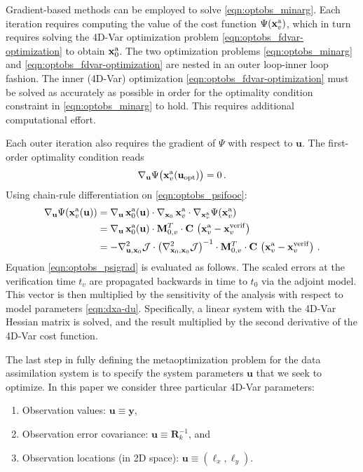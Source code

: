 \documentclass{article}
\newcommand{\Jfunc}{\mathcal J }
\newcommand{\M}{\mathbf{M}}
\newcommand{\C}{\mathbf{C}}
\newcommand{\R}{\mathbf{R}}
\newcommand{\x}{   \mathbf{x} }
\newcommand{\xa}{ \mathbf{x}^{\rm a} }
\newcommand{\y}{ \mathbf{y} }
\renewcommand{\u}{ \mathbf{u} }
\begin{document}
Gradient-based methods can be employed to solve \eqref{eqn:optobs_minarg}.
Each iteration requires computing the value of the cost function $\Psi(\xa_v)$,
which in turn requires solving the 4D-Var optimization problem \eqref{eqn:optobs_fdvar-optimization}   to obtain $\xa_0$.
The two optimization problems \eqref{eqn:optobs_minarg} and \eqref{eqn:optobs_fdvar-optimization} are nested in an outer loop-inner loop fashion.
The inner (4D-Var) optimization \eqref{eqn:optobs_fdvar-optimization} must be solved as accurately as possible 
in order for the optimality condition constraint in \eqref{eqn:optobs_minarg} to hold.
This requires additional computational effort.

Each outer iteration also requires the gradient of $\Psi$ with respect to $\u$.
The first-order optimality condition reads
\begin{align}
 \nabla_\u \Psi\bigl(\xa_v(\u_\textrm{opt})\bigr) = 0\,.
 \label{eqn:optobs_psifooc}
 \end{align}
Using chain-rule differentiation on \eqref{eqn:optobs_psifooc}:
\begin{align}
 \nabla_\u \Psi(\xa_v(\u)) &= \nabla_\u \, \xa_0(\u) \cdot \nabla_{\x_0} \, \xa_v \cdot \nabla_{\xa_v} \Psi(\xa_v) \nonumber \\
                                 &= \nabla_\u \, \xa_0(\u) \cdot \M^T_{0,v} \cdot \C \, \left( \xa_v -\x^{\rm verif}_v \right) \nonumber \\
                              &=    -\nabla_{\u,\x_0}^2 \Jfunc  \cdot \left(\nabla_{\x_0,\x_0}^2 \Jfunc \right) ^{-1}\cdot \M^T_{0,v} \cdot \C \, \left( \xa_v -\x^{\rm verif}_v \right)\,.
 \label{eqn:optobs_psigrad}
\end{align}
Equation \eqref{eqn:optobs_psigrad} is evaluated as follows. The scaled errors at the 
verification time $t_v$ are propagated backwards in time
to $t_0$ via the adjoint model. This vector is then multiplied by the sensitivity of the 
analysis with respect to model parameters \eqref{eqn:dxa-du}. Specifically, a linear system with the 4D-Var Hessian
matrix is solved, and the result multiplied by the second derivative of the 4D-Var cost function. 

The last step in fully defining the metaoptimization problem for the data assimilation system is to specify the system parameters $\u$ that we seek to optimize.
In this paper we consider three particular 4D-Var parameters:
\begin{enumerate}
 \item Observation values: $\u \equiv \y$,
 \item Observation error covariance: $\u \equiv \R_k^{-1}$, and
 \item Observation locations (in 2D space): $\u \equiv (\ell_x,\ell_y)$.
\end{enumerate}
\end{document}
